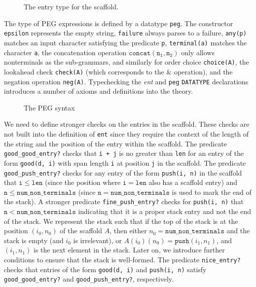 \documentclass[sigplan,10pt,anonymous,review]{acmart}\settopmatter{printfolios=true,printccs=false,printacmref=false}
\begin{document}
\begin{CCSXML}
\begin{figure}[h!]
  {}
  \vspace*{-4mm}
			\caption{The entry type for the scaffold.}
			\label{pvs:ent}
\end{figure}

The type of PEG expressions is defined by a datatype \texttt{peg}.  The
constructor \texttt{epsilon} represents the empty string,
\texttt{failure} always parses to a failure, \texttt{any(p)} matches
an input character satisfying the predicate \texttt{p},
\texttt{terminal(a)} matches the character \texttt{a}, the
concatenation operation $\mathtt{concat(n_1, n_2)}$ only allows nonterminals
as the sub-grammars, and similarly for order choice
\texttt{choice(A)}, the lookahead check \texttt{check(A)} (which
corresponds to the $\&$ operation), and the negation operation
\texttt{neg(A)}\@.  Typechecking the \emph{ent} and \texttt{peg}
\texttt{DATATYPE} declarations introduces a number of
axioms and definitions into the theory.

\begin{figure}[h!]
  {}
  \vspace*{-4mm}
			\caption{The PEG syntax}
			\label{pvs:peg}
\end{figure}




We need to define stronger checks on the entries in the scaffold.
These checks are not built into the definition of \texttt{ent} since
they require the context of the length of the string and the position
of the entry within the scaffold.
The predicate \texttt{good\_good\_entry?} checks that
 \texttt{i + j} is no greater than \texttt{len} 
for an entry of the form \texttt{good(d, i)} with span length \texttt{i}
at position \texttt{j} in the scaffold.  The predicate \texttt{good\_push\_entry?}
checks for any entry of the form \texttt{push(i, n)} in the scaffold
that $\mathtt{i} \leq \mathtt{len}$ (since the position where $\mathtt{i} = \mathtt{len}$ also has a scaffold entry) 
and $ \mathtt{n}\leq \mathtt{num\_non\_terminals}$ (since $\mathtt{n} = \mathtt{num\_non\_terminals}$ is used to mark the end of the stack).  A stronger predicate
\texttt{fine\_push\_entry?} checks for \texttt{push(i, n)} that $\mathtt{n} < \mathtt{num\_non\_terminals}$ indicating that it is a proper stack entry and not the
end of the stack.  We represent the stack such that if the
top of the stack is at the position $(i_0, n_0)$ of the scaffold $A$, then
either $n_0 = \mathtt{num\_non\_terminals}$ and the stack is empty
(and $i_0$ is irrelevant), or $A(i_0)(n_0) = \mathtt{push}(i_1, n_1)$, and
$(i_1, n_1)$ is the next element in the stack.  Later on, we introduce further conditions
to ensure that the stack is well-formed.  The predicate \texttt{nice\_entry?} checks that entries of the form \texttt{good(d, i)} and \texttt{push(i, n)} satisfy \texttt{good\_good\_entry?} and \texttt{good\_push\_entry?}, respectively.


\end{CCSXML}
\end{document}
